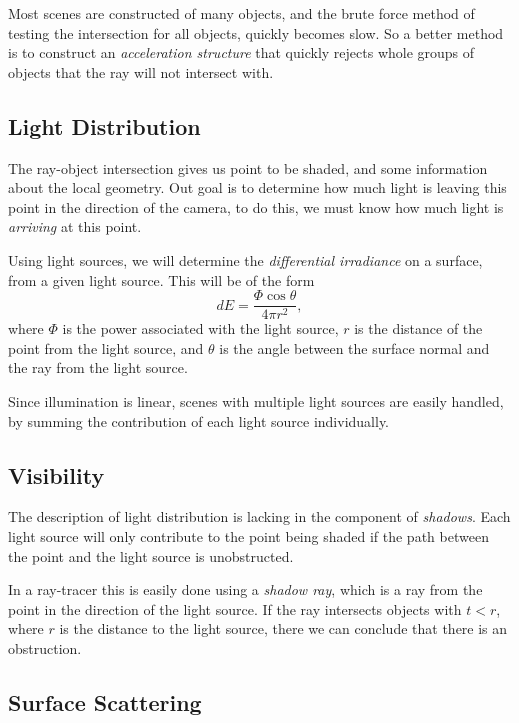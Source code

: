 \documentclass[
]{book}
\begin{document}
Most scenes are constructed of many objects, and the brute force method of
testing the intersection for all objects, quickly becomes slow. So a better
method is to construct an \emph{acceleration structure} that quickly rejects whole
groups of objects that the ray will not intersect with.

\hypertarget{light-distribution}{%
\subsection{Light Distribution}\label{light-distribution}}

The ray-object intersection gives us point to be shaded, and some information
about the local geometry. Out goal is to determine how much light is leaving
this point in the direction of the camera, to do this, we must know how much
light is \emph{arriving} at this point.

Using light sources, we will determine the \emph{differential irradiance} on a
surface, from a given light source. This will be of the form
\[
dE=\frac{\Phi\cos\theta}{4\pi r^2},
\]
where \(\Phi\) is the power associated with the light source, \(r\) is the distance
of the point from the light source, and \(\theta\) is the angle between the
surface normal and the ray from the light source.

Since illumination is linear, scenes with multiple light sources are easily
handled, by summing the contribution of each light source individually.

\hypertarget{visibility}{%
\subsection{Visibility}\label{visibility}}

The description of light distribution is lacking in the component of \emph{shadows}.
Each light source will only contribute to the point being shaded if the path
between the point and the light source is unobstructed.

In a ray-tracer this is easily done using a \emph{shadow ray}, which is a ray from
the point in the direction of the light source. If the ray intersects objects
with \(t<r\), where \(r\) is the distance to the light source, there we can
conclude that there is an obstruction.

\hypertarget{surface-scattering}{%
\subsection{Surface Scattering}\label{surface-scattering}}
\end{document}
